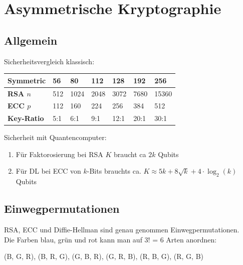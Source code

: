\documentclass[12pt]{scrartcl}
\begin{document}
\newpage
\section{Asymmetrische Kryptographie}

\subsection{Allgemein}

Sicherheitsvergleich klassisch:
\renewcommand{\arraystretch}{1.5}
\begin{center}
    \begin{tabular}{ | m{11em} | P{4em} | P{4em} | P{4em} | P{4em} | P{4em} | P{4em} |}
        \hline
        \textbf{Symmetric}   & \textbf{56}    & \textbf{80}    & \textbf{112}   & \textbf{128}   & \textbf{192}   & \textbf{256}   \\
        \hline
        \textbf{RSA $n$  }   & 512   & 1024  & 2048  & 3072  & 7680  & 15360     \\
        \hline
        \textbf{ECC $p$  }   & 112   & 160   & 224   & 256   & 384   & 512     \\
        \hline
        \textbf{Key-Ratio}   & 5:1   & 6:1   & 9:1   & 12:1  & 20:1  & 30:1     \\
        \hline
    \end{tabular}
\end{center}


\vspace{0.5cm}
Sicherheit mit Quantencomputer:
\begin{enumerate}
    \item Für Faktorosierung bei RSA $K$ braucht ca $2k$ Qubits
    \item Für DL bei ECC von $k$-Bits brauchts ca. $K \approx 5k + 8 \sqrt{k} + 4 \cdot \log_2(k)$ Qubits
\end{enumerate}



\newpage
\subsection{Einwegpermutationen}

RSA, ECC und Diffie-Hellman sind genau genommen Einwegpermutationen.\\

Die Farben blau, grün und rot kann man auf 3! = 6 Arten anordnen:

\begin{center}
    (B, G, R), (B, R, G), (G, B, R), (G, R, B), (R, B, G), (R, G, B)    
\end{center}
\end{document}
